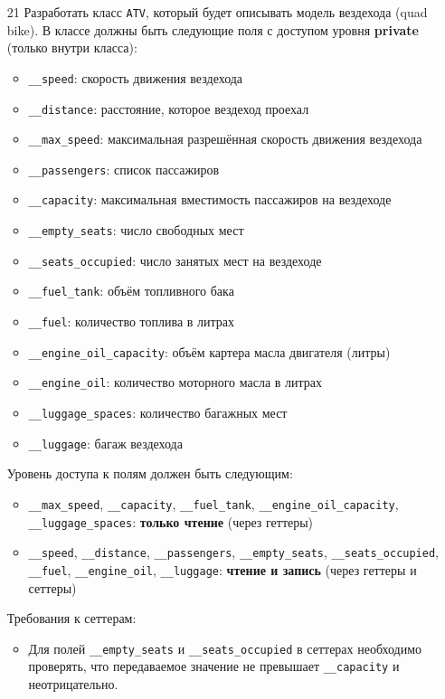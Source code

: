 \begin{enumerate}
\item[21] Разработать класс \texttt{ATV}, который будет описывать модель вездехода (quad bike). В классе должны быть следующие поля с доступом уровня \textbf{private} (только внутри класса):
\begin{itemize}
    \item \texttt{\_\_speed}: скорость движения вездехода  
    \item \texttt{\_\_distance}: расстояние, которое вездеход проехал  
    \item \texttt{\_\_max\_speed}: максимальная разрешённая скорость движения вездехода  
    \item \texttt{\_\_passengers}: список пассажиров  
    \item \texttt{\_\_capacity}: максимальная вместимость пассажиров на вездеходе  
    \item \texttt{\_\_empty\_seats}: число свободных мест  
    \item \texttt{\_\_seats\_occupied}: число занятых мест на вездеходе  
    \item \texttt{\_\_fuel\_tank}: объём топливного бака  
    \item \texttt{\_\_fuel}: количество топлива в литрах  
    \item \texttt{\_\_engine\_oil\_capacity}: объём картера масла двигателя (литры)  
    \item \texttt{\_\_engine\_oil}: количество моторного масла в литрах  
    \item \texttt{\_\_luggage\_spaces}: количество багажных мест  
    \item \texttt{\_\_luggage}: багаж вездехода  
\end{itemize}
Уровень доступа к полям должен быть следующим:
\begin{itemize}
    \item \texttt{\_\_max\_speed}, \texttt{\_\_capacity}, \texttt{\_\_fuel\_tank}, \texttt{\_\_engine\_oil\_capacity}, \texttt{\_\_luggage\_spaces}: \textbf{только чтение} (через геттеры)  
    \item \texttt{\_\_speed}, \texttt{\_\_distance}, \texttt{\_\_passengers}, \texttt{\_\_empty\_seats}, \texttt{\_\_seats\_occupied}, \texttt{\_\_fuel}, \texttt{\_\_engine\_oil}, \texttt{\_\_luggage}: \textbf{чтение и запись} (через геттеры и сеттеры)
\end{itemize}
Требования к сеттерам:
\begin{itemize}
    \item Для полей \texttt{\_\_empty\_seats} и \texttt{\_\_seats\_occupied} в сеттерах необходимо проверять, что передаваемое значение не превышает \texttt{\_\_capacity} и неотрицательно.  

\end{itemize}
\end{enumerate}
